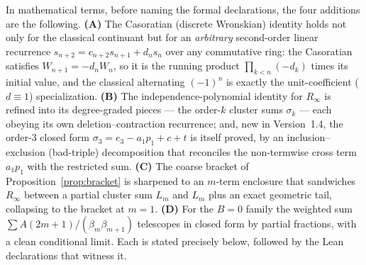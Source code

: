 \documentclass[11pt]{article}
\newcommand{\Rinf}{R_\infty}
\begin{document}
In mathematical terms, before naming the formal declarations, the four additions are
the following. \textbf{(A)} The Casoratian (discrete Wronskian) identity holds not
only for the classical continuant but for an \emph{arbitrary} second-order linear
recurrence $s_{n+2}=c_{n+2}s_{n+1}+d_ns_n$ over any commutative ring: the Casoratian
satisfies $W_{n+1}=-d_nW_n$, so it is the running product $\prod_{k<n}(-d_k)$ times its
initial value, and the classical alternating $(-1)^n$ is exactly the unit-coefficient
($d\equiv1$) specialization. \textbf{(B)} The independence-polynomial identity for
$\Rinf$ is refined into its degree-graded pieces --- the order-$k$ cluster sums
$\sigma_k$ --- each obeying its own deletion--contraction recurrence; and, new in
Version~1.4, the order-$3$ closed form $\sigma_3=e_3-a_1p_1+c+t$ is itself proved, by
an inclusion--exclusion (bad-triple) decomposition that reconciles the non-termwise
cross term $a_1p_1$ with the restricted sum. \textbf{(C)} The coarse bracket of
Proposition~\ref{prop:bracket} is sharpened to an $m$-term enclosure that sandwiches
$\Rinf$ between a partial cluster sum $L_m$ and $L_m$ plus an exact geometric tail,
collapsing to the bracket at $m=1$. \textbf{(D)} For the $B=0$ family the weighted
sum $\sum A(2m+1)/(\beta_m\beta_{m+1})$ telescopes in closed form by partial fractions,
with a clean conditional limit. Each is stated precisely below, followed by the Lean
declarations that witness it.
\end{document}
